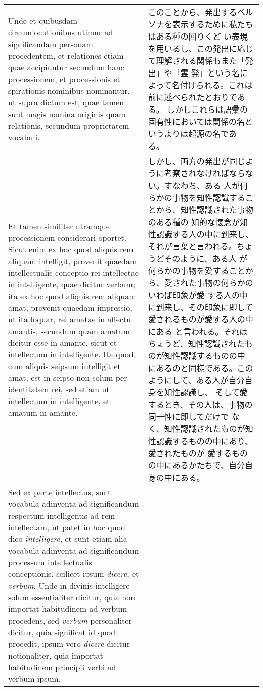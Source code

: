 \documentclass[10pt]{jsarticle} %
\begin{document}
\begin{longtable}{p{21em}p{21em}}
\\



Unde et quibusdam
circumlocutionibus utimur ad significandam personam procedentem, et
relationes etiam quae accipiuntur secundum hanc processionem, et
processionis et spirationis nominibus nominantur, ut supra dictum est,
quae tamen sunt magis nomina originis quam relationis, secundum
proprietatem vocabuli. 


&

このことから、発出するペルソナを表示するために私たちはある種の回りくど
 い表現を用いるし、この発出に応じて理解される関係もまた「発出」や「霊
 発」という名によって名付けられる。これは前に述べられたとおりである。
 しかしこれらは語彙の固有性においては関係の名というよりは起源の名であ
 る。

\\


Et tamen similiter utramque processionem
considerari oportet. Sicut enim ex hoc quod aliquis rem aliquam
intelligit, provenit quaedam intellectualis conceptio rei intellectae
in intelligente, quae dicitur verbum; ita ex hoc quod aliquis rem
aliquam amat, provenit quaedam impressio, ut ita loquar, rei amatae in
affectu amantis, secundum quam amatum dicitur esse in amante, sicut et
intellectum in intelligente. Ita quod, cum aliquis seipsum intelligit
et amat, est in seipso non solum per identitatem rei, sed etiam ut
intellectum in intelligente, et amatum in amante. 


&

しかし、両方の発出が同じように考察されなければならない。すなわち、ある
 人が何らかの事物を知性認識することから、知性認識された事物のある種の
 知的な懐念が知性認識する人の中に到来し、それが言葉と言われる。ちょうどそのように、ある人
 が何らかの事物を愛することから、愛された事物の何らかのいわば印象が愛
 する人の中に到来し、その印象に即して愛されるものが愛する人の中にある
 と言われる。それはちょうど、知性認識されたものが知性認識するものの中
 にあるのと同様である。このようにして、ある人が自分自身を知性認識し、
 そして愛するとき、その人は、事物の同一性に即してだけで
 なく、知性認識されたものが知性認識するものの中にあり、愛されたものが
 愛するものの中にあるかたちで、自分自身の中にある。

\\


Sed ex parte
intellectus, sunt vocabula adinventa ad significandum respectum
intelligentis ad rem intellectam, ut patet in hoc quod dico
{\itshape intelligere}, et sunt etiam alia vocabula adinventa ad significandum
processum intellectualis conceptionis, scilicet ipsum {\itshape dicere}, et
{\itshape verbum}. Unde in divinis intelligere solum essentialiter dicitur, quia
non importat habitudinem ad verbum procedens, sed {\itshape verbum} personaliter
dicitur, quia significat id quod procedit, ipsum vero {\itshape dicere} dicitur
notionaliter, quia importat habitudinem principii verbi ad verbum
ipsum. 



\end{longtable}
\end{document}
